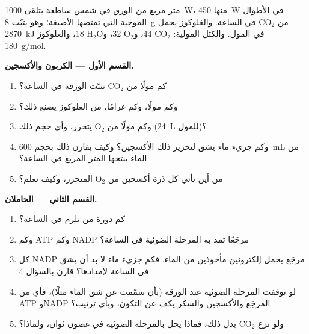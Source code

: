 \begin{problem}
\label{pb:g12:photosynthesis:1}
متر مربع من الورق في شمس ساطعة يتلقى \qty{1000}{W}، منها
\qty{450}{W} في الأطوال الموجية التي تمتصها الأصبغة؛ وهو يثبّت
\qty{8}{g} من $\mathrm{CO_2}$ في الساعة. والغلوكوز يحمل \qty{2870}{kJ}
في المول. والكتل المولية: $\mathrm{CO_2}$ 44، و$\mathrm{O_2}$ 32،
و$\mathrm{H_2O}$ 18، والغلوكوز \qty{180}{g/mol}.

\medskip
\noindent\textbf{القسم الأول --- الكربون والأكسجين.}
\begin{enumerate}
  \item كم مولًا من $\mathrm{CO_2}$ تثبّت الورقة في الساعة؟
  \item وكم مولًا، وكم غرامًا، من الغلوكوز يصنع ذلك؟
  \item وكم مولًا من $\mathrm{O_2}$ يتحرر، وأي حجم ذلك (\qty{24}{L}
        للمول)؟
  \item وكم جزيء ماء يشق لتحرير ذلك الأكسجين؟ وكيف يقارن ذلك
        بحجم \qty{600}{mL} من الماء ينتحها المتر المربع في الساعة؟
  \item من أين تأتي كل ذرة أكسجين من $\mathrm{O_2}$ المتحرر، وكيف
        تعلم؟
\end{enumerate}

\medskip
\noindent\textbf{القسم الثاني --- الحاملان.}
\begin{enumerate}[resume]
  \item كم دورة من  تلزم في الساعة؟
  \item وكم ATP وكم NADP مرجَعًا تمد به المرحلة الضوئية في الساعة؟
  \item كل NADP مرجَع يحمل إلكترونين مأخوذين من الماء. فكم جزيء ماء لا
        بد أن يشق في الساعة لإمدادها؟ قارن بالسؤال 4.
  \item لو توقفت المرحلة الضوئية عند الورقة (بأن سمّمت  عن شق الماء مثلًا)، فأي من ATP وNADP المرجَع والأكسجين
        والسكر يكف عن التكون، وبأي ترتيب؟
  \item ولو نزع $\mathrm{CO_2}$ بدل ذلك، فماذا يحل بالمرحلة الضوئية في
        غضون ثوان، ولماذا؟
\end{enumerate}


\end{problem}
